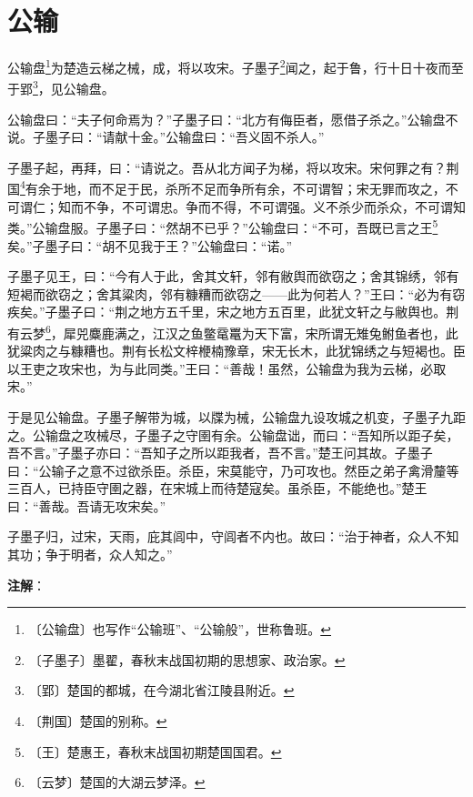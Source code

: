 \documentclass[12pt,UTF-8,openany]{ctexbook}
\begin{document}
\chapter{公输}

\begin{normalsize}
    
    公输盘\footnote{〔公输盘〕也写作“公输班”、“公输般”，世称鲁班。}为楚造云梯之械，成，将以攻宋。子墨子\footnote{〔子墨子〕墨翟，春秋末战国初期的思想家、政治家。}闻之，起于鲁，行十日十夜而至于郢\footnote{〔郢〕楚国的都城，在今湖北省江陵县附近。}，见公输盘。
    
    公输盘曰：“夫子何命焉为？”子墨子曰：“北方有侮臣者，愿借子杀之。”公输盘不说。子墨子曰：“请献十金。”公输盘曰：“吾义固不杀人。”
    
    子墨子起，再拜，曰：“请说之。吾从北方闻子为梯，将以攻宋。宋何罪之有？荆国\footnote{〔荆国〕楚国的别称。}有余于地，而不足于民，杀所不足而争所有余，不可谓智；宋无罪而攻之，不可谓仁；知而不争，不可谓忠。争而不得，不可谓强。义不杀少而杀众，不可谓知类。”公输盘服。子墨子曰：“然胡不已乎？”公输盘曰：“不可，吾既已言之王\footnote{〔王〕楚惠王，春秋末战国初期楚国国君。}矣。”子墨子曰：“胡不见我于王？”公输盘曰：“诺。”
    
    子墨子见王，曰：“今有人于此，舍其文轩，邻有敝舆而欲窃之；舍其锦绣，邻有短褐而欲窃之；舍其粱肉，邻有糠糟而欲窃之——此为何若人？”王曰：“必为有窃疾矣。”子墨子曰：“荆之地方五千里，宋之地方五百里，此犹文轩之与敝舆也。荆有云梦\footnote{〔云梦〕楚国的大湖云梦泽。}，犀兕麋鹿满之，江汉之鱼鳖鼋鼍为天下富，宋所谓无雉兔鲋鱼者也，此犹粱肉之与糠糟也。荆有长松文梓楩楠豫章，宋无长木，此犹锦绣之与短褐也。臣以王吏之攻宋也，为与此同类。”王曰：“善哉！虽然，公输盘为我为云梯，必取宋。”
    
    于是见公输盘。子墨子解带为城，以牒为械，公输盘九设攻城之机变，子墨子九距之。公输盘之攻械尽，子墨子之守圉有余。公输盘诎，而曰：“吾知所以距子矣，吾不言。”子墨子亦曰：“吾知子之所以距我者，吾不言。”楚王问其故。子墨子曰：“公输子之意不过欲杀臣。杀臣，宋莫能守，乃可攻也。然臣之弟子禽滑釐等三百人，已持臣守圉之器，在宋城上而待楚寇矣。虽杀臣，不能绝也。”楚王曰：“善哉。吾请无攻宋矣。”
    
    子墨子归，过宋，天雨，庇其闾中，守闾者不内也。故曰：“治于神者，众人不知其功；争于明者，众人知之。”
\end{normalsize}


\newpage

\textbf{注解}：

\vspace{-1em}
\end{document}

